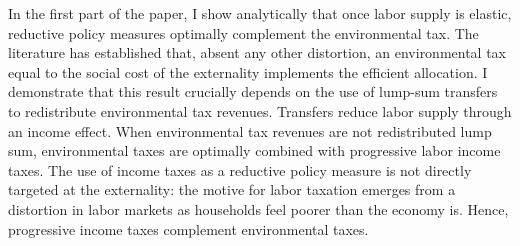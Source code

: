 
In the first part of the paper, I show analytically that once 
labor supply is elastic, reductive policy measures optimally complement the environmental tax. 
The literature has established that, absent any other distortion, an environmental tax equal to the social cost of the externality implements the efficient allocation. 
I demonstrate that this result crucially depends on the use of lump-sum transfers to redistribute environmental tax revenues. Transfers reduce labor supply through an income effect. %
When environmental tax revenues are not redistributed lump sum, environmental taxes are optimally combined with progressive labor income taxes. The use of income taxes as a reductive policy measure is not directly targeted at the externality: the motive for labor taxation emerges from a distortion in labor markets as households feel poorer than the economy is. %
Hence, progressive income taxes complement environmental taxes. %

